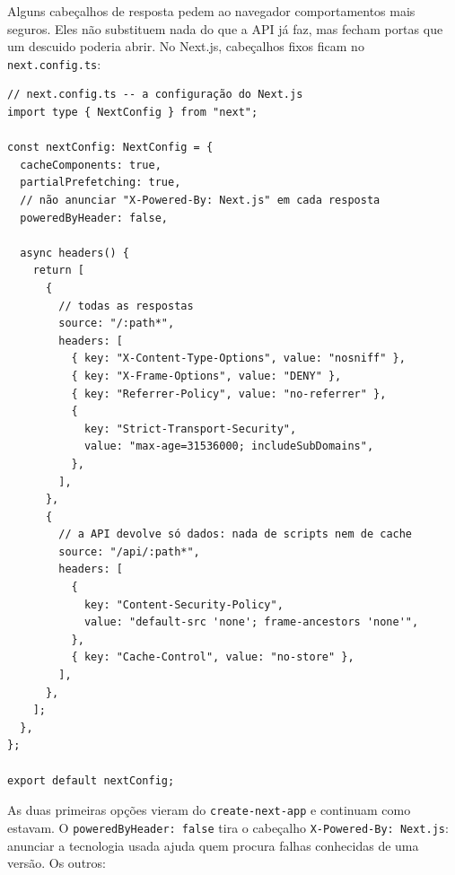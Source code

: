 Alguns cabeçalhos de resposta pedem ao navegador comportamentos mais seguros. Eles não substituem nada do que a API já faz, mas fecham portas que um descuido poderia abrir. No Next.js, cabeçalhos fixos ficam no \texttt{next.config.ts}:

\begin{codigo}
\begin{Verbatim}[breaklines=true, breaksymbolleft={}, fontsize=\footnotesize]
// next.config.ts -- a configuração do Next.js
import type { NextConfig } from "next";

const nextConfig: NextConfig = {
  cacheComponents: true,
  partialPrefetching: true,
  // não anunciar "X-Powered-By: Next.js" em cada resposta
  poweredByHeader: false,

  async headers() {
    return [
      {
        // todas as respostas
        source: "/:path*",
        headers: [
          { key: "X-Content-Type-Options", value: "nosniff" },
          { key: "X-Frame-Options", value: "DENY" },
          { key: "Referrer-Policy", value: "no-referrer" },
          {
            key: "Strict-Transport-Security",
            value: "max-age=31536000; includeSubDomains",
          },
        ],
      },
      {
        // a API devolve só dados: nada de scripts nem de cache
        source: "/api/:path*",
        headers: [
          {
            key: "Content-Security-Policy",
            value: "default-src 'none'; frame-ancestors 'none'",
          },
          { key: "Cache-Control", value: "no-store" },
        ],
      },
    ];
  },
};

export default nextConfig;
\end{Verbatim}
\end{codigo}

As duas primeiras opções vieram do \texttt{create-next-app} e continuam como estavam. O \texttt{poweredByHeader: false} tira o cabeçalho \texttt{X-Powered-By: Next.js}: anunciar a tecnologia usada ajuda quem procura falhas conhecidas de uma versão. Os outros:


